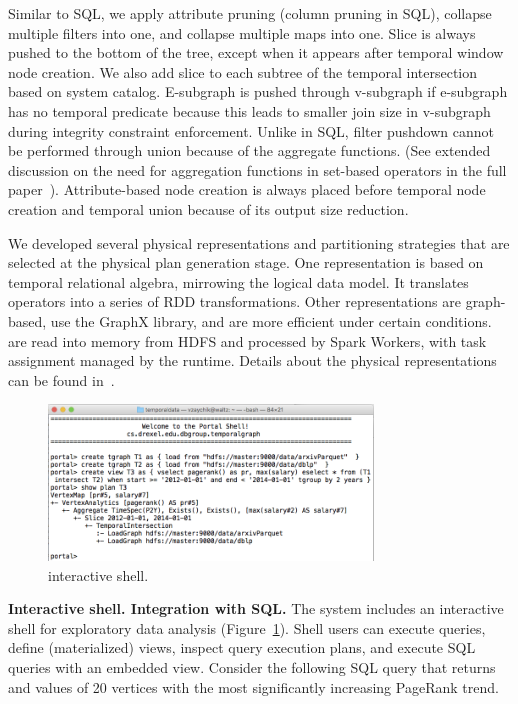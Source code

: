 Similar to SQL, we apply attribute pruning (column pruning in SQL),
collapse multiple filters into one, and collapse multiple maps into
one.  Slice is always pushed to the bottom of the tree, except when it
appears after temporal window node creation.  We also add slice to
each subtree of the temporal intersection based on system catalog.
E-subgraph is pushed through v-subgraph if e-subgraph has no temporal
predicate because this leads to smaller join size in v-subgraph during
integrity constraint enforcement.  Unlike in SQL, filter pushdown
cannot be performed through union because of the aggregate functions.
(See extended discussion on the need for aggregation functions in
set-based operators in the full paper~\cite{PortalarXiv2016}).
Attribute-based node creation is always placed before temporal node
creation and temporal union because of its output size reduction.

We developed several physical representations and partitioning
strategies that are selected at the physical plan generation stage.
One representation is based on temporal relational algebra, mirrowing
the logical data model.  It translates \tga operators into a series of
RDD transformations.  Other representations are graph-based, use the
GraphX library, and are more efficient under certain conditions.  \tgs
are read into memory from HDFS and processed by Spark Workers, with
task assignment managed by the runtime.  Details about the physical
representations can be found in~\cite{PortalarXiv2016}.

\begin{figure}[t]
\centering
\includegraphics[width=3.4in]{figs/shell.png}
\caption{\sys interactive shell.}
\label{fig:shell}
\end{figure}

{\bf Interactive shell. Integration with SQL.}  The \sys system
includes an interactive shell for exploratory data analysis
(Figure~\ref{fig:shell}). Shell users can execute queries, define
(materialized) views, inspect query execution plans, and execute SQL
queries with an embedded \ql view. Consider the following SQL query
that returns  and  values of 20 vertices with the
most significantly increasing PageRank trend.

